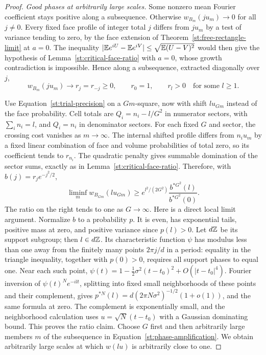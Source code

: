 \begin{proof}
\emph{Good phases at arbitrarily large scales.}
Some nonzero mean Fourier coefficient stays positive along a subsequence.
Otherwise $w_{B_m}(ju_m)\to0$ for all $j\ne0$. Every fixed face profile of
integer total $j$ differs from $ju_m$ by a test of variance tending to
zero, by the face extension of Theorem~\ref{st:free-rectangle-limit} at
$a=0$. The inequality
$|\mathbb E e^{iU}-\mathbb E e^{iV}|\le\sqrt{\mathbb E(U-V)^2}$ would then give the hypothesis
of Lemma~\ref{st:critical-face-ratio} with $a=0$, whose growth contradiction
is impossible. Hence along a subsequence, extracted diagonally over $j$,
\[
 w_{B_m}(ju_m)\longrightarrow r_j=r_{-j}\ge0,
 \qquad r_0=1,\qquad r_l>0\quad\text{for some }l\ge1.
\]

Use Equation~\eqref{st:trial-precision} on a $Gm$-square, now with shift
$l u_{Gm}$ instead of the face probability. Cell totals are
$Q_i=n_i-l/G^2$ in numerator sectors, with $\sum_i n_i=l$, and $Q_i=n_i$
in denominator sectors. For each fixed $G$ and sector, the crossing cost
vanishes as $m\to\infty$. The internal shifted profile differs from
$n_i u_m$ by a fixed linear combination of face and volume probabilities
of total zero, so its coefficient tends to $r_{n_i}$. The quadratic
penalty gives summable domination of the sector sums, exactly as in
Lemma~\ref{st:critical-face-ratio}. Therefore, with $b(j)=r_je^{-j^2/2}$,
\begin{equation}\label{st:phase-amplification}
 \liminf_m w_{B_{Gm}}(lu_{Gm})
 \ge e^{l^2/(2G^2)}\frac{b^{*G^2}(l)}{b^{*G^2}(0)}.
\end{equation}
The ratio on the right tends to one as $G\to\infty$. Here is a direct
local limit argument. Normalize $b$ to a probability $p$. It is even, has
exponential tails, positive mass at zero, and positive variance since
$p(l)>0$. Let $d\mathbb Z$ be its support subgroup; then $l\in d\mathbb Z$. Its
characteristic function $\psi$ has modulus less than one away from the
finitely many points $2\pi j/d$ in a period: equality in the triangle
inequality, together with $p(0)>0$, requires all support phases to equal
one. Near each such point,
$\psi(t)=1-\frac12\sigma^2(t-t_0)^2+O(|t-t_0|^4)$.
Fourier inversion of $\psi(t)^N e^{-ilt}$, splitting into fixed small
neighborhoods of these points and their complement, gives
$p^{*N}(l)=d(2\pi N\sigma^2)^{-1/2}(1+o(1))$, and the same formula at zero.
The complement is exponentially small, and the neighborhood calculation
uses $u=\sqrt N(t-t_0)$ with a Gaussian dominating bound. This proves the
ratio claim. Choose $G$ first and then arbitrarily large members $m$ of
the subsequence in Equation~\eqref{st:phase-amplification}. We obtain
arbitrarily large scales at which $w(lu)$ is arbitrarily close to one.


\end{proof}
